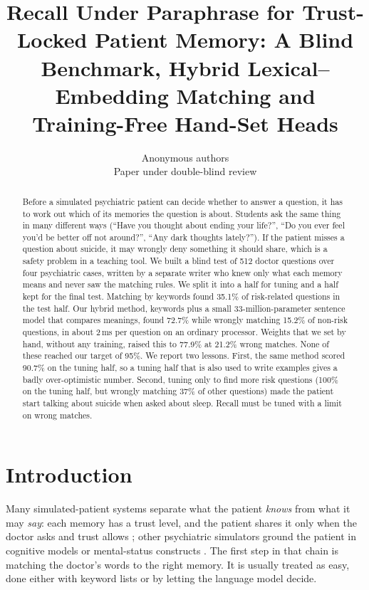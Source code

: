 \documentclass[10pt]{article}
\title{Recall Under Paraphrase for Trust-Locked Patient Memory: A Blind Benchmark, Hybrid Lexical--Embedding Matching and Training-Free Hand-Set Heads}
\author{\name Anonymous authors\\ Paper under double-blind review}
\begin{document}
\maketitle
\begin{abstract}
Before a simulated psychiatric patient can decide whether to answer a question, it has to work out which of its memories the question is
about. Students ask the same thing in many different ways (``Have you thought about ending your life?'', ``Do you ever feel you'd be better off
not around?'', ``Any dark thoughts lately?''). If the patient misses a question about suicide, it may wrongly deny something it should share, which
is a safety problem in a teaching tool. We built a blind test of 512 doctor questions over four psychiatric cases, written by a separate writer
who knew only what each memory means and never saw the matching rules. We split it into a half for tuning and a half kept for the final test.
Matching by keywords found 35.1\% of risk-related questions in the test half. Our hybrid method, keywords plus a small 33-million-parameter
sentence model that compares meanings, found 72.7\% while wrongly matching 15.2\% of non-risk questions, in about 2\,ms per question on an
ordinary processor. Weights that we set by hand, without any training, raised this to 77.9\% at 21.2\% wrong matches. None of these reached our
target of 95\%. We report two lessons. First, the same method scored 90.7\% on the tuning half, so a tuning half that is also used to write
examples gives a badly over-optimistic number. Second, tuning only to find more risk questions (100\% on the tuning half, but wrongly matching
37\% of other questions) made the patient start talking about suicide when asked about sleep. Recall must be tuned with a limit on wrong
matches.
\end{abstract}

\section{Introduction}
Many simulated-patient systems separate what the patient \emph{knows} from what it may \emph{say}: each memory has a trust level, and the patient
shares it only when the doctor asks and trust allows \citep{sabour2026patientact}; other psychiatric simulators ground the patient in
cognitive models or mental-status constructs \citep{wang2024patient,lee2025psyche}. The first step in that chain is
matching the doctor's words to the right memory. It is usually treated as easy, done either with keyword lists or by letting the language
model decide.
\end{document}
